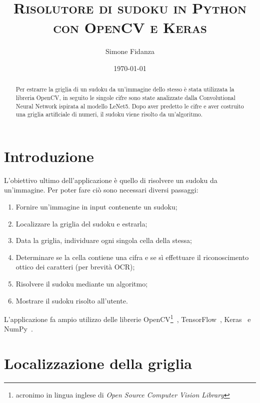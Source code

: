 \documentclass[a4paper, 10pt]{article}
\begin{document}
\title{\textsc{Risolutore di sudoku in Python con OpenCV e Keras}}
\author{Simone Fidanza}
\date{\today}


\maketitle

\begin{abstract}
    Per estrarre la griglia di un sudoku da un'immagine dello stesso è stata
    utilizzata la libreria OpenCV, in seguito le singole cifre sono state
    analizzate dalla Convolutional Neural Network ispirata al modello LeNet5.
    Dopo aver predetto le cifre e aver costruito una griglia artificiale di
    numeri, il sudoku viene risolto da un'algoritmo.
\end{abstract}


\section{Introduzione}\label{sec:introduzione}

L'obiettivo ultimo dell'applicazione è quello di risolvere un sudoku da
un'immagine. Per poter fare ciò sono necessari diversi passaggi:

\begin{enumerate}
    \item Fornire un'immagine in input contenente un sudoku;
    \item Localizzare la griglia del sudoku e estrarla;
    \item Data la griglia, individuare ogni singola cella della stessa;
    \item Determinare se la cella contiene una cifra e se sì effettuare il
        riconoscimento ottico dei caratteri (per brevità OCR);
    \item Risolvere il sudoku mediante un algoritmo;
    \item Mostrare il sudoku risolto all'utente.
\end{enumerate}

L'applicazione fa ampio utilizzo delle librerie OpenCV\footnote{acronimo in
lingua inglese di \emph{Open Source Computer Vision Library}
}~\cite{opencv_library}, TensorFlow~\cite{tensorflow2015-whitepaper},
Keras~\cite{chollet2015keras} e NumPy~\cite{harris2020array}.


\section{Localizzazione della griglia}
\end{document}
